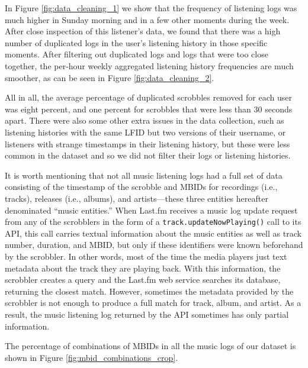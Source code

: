 In Figure \ref{fig:data_cleaning_1} we show that the frequency of listening logs was much higher in Sunday morning and in a few other moments during the week. After close inspection of this listener's data, we found that there was a high number of duplicated logs in the user's listening history in those specific moments. After filtering out duplicated logs and logs that were too close together, the per-hour weekly aggregated listening history frequencies are much smoother, as can be seen in Figure \ref{fig:data_cleaning_2}.









All in all, the average percentage of duplicated scrobbles removed for each user was eight percent, and one percent for scrobbles that were less than 30 seconds apart. There were also some other extra issues in the data collection, such as listening histories with the same LFID but two versions of their username, or listeners with strange timestamps in their listening history, but these were less common in the dataset and so we did not filter their logs or listening histories.





It is worth mentioning that not all music listening logs had a full set of data consisting of the timestamp of the scrobble and MBIDs for recordings (i.e., tracks), releases (i.e., albums), and artists---these three entities hereafter denominated ``music entities.'' When Last.fm receives a music log update request from any of the scrobblers in the form of a {\tt track.updateNowPlaying()} call to its API, this call carries textual information about the music entities as well as track number, duration, and MBID, but only if these identifiers were known beforehand by the scrobbler. In other words, most of the time the media players just text metadata about the track they are playing back. With this information, the scrobbler creates a query and the Last.fm web service searches its database, returning the closest match. However, sometimes the metadata provided by the scrobbler is not enough to produce a full match for track, album, and artist. As a result, the music listening log returned by the API sometimes has only partial information.




The percentage of combinations of MBIDs in all the music logs of our dataset is shown in Figure \ref{fig:mbid_combinations_crop}.

